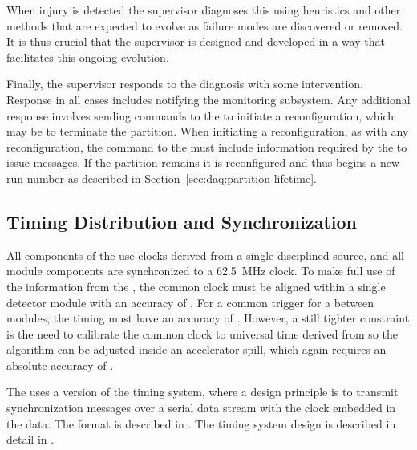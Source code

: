 When injury is detected the supervisor  diagnoses this using heuristics and other methods that are expected to evolve as failure modes are discovered or removed. 
It is thus crucial that the supervisor is designed and developed in a way that facilitates this ongoing evolution.  

Finally, the supervisor responds to the diagnosis with some intervention. 
Response  in all cases includes notifying the monitoring subsystem. 
Any additional response involves sending commands to the  to initiate a reconfiguration,  which may be to terminate the partition.
When initiating a reconfiguration, as with any reconfiguration, the command to the  must include information required by the  to issue  messages. 
If the partition remains it is reconfigured and thus begins a new run number as described in Section~\ref{sec:daq:partition-lifetime}.




\subsection{Timing Distribution and Synchronization}
\label{sec:sp-daq:design-timing}

All components of the  use clocks derived from a single  disciplined source, and all module components are synchronized to a \SI{62.5}{MHz} clock. 
To make full use of the information from the , the common clock must be aligned within a single detector %
module with an accuracy of . 
For a common trigger for a  between modules, the timing must have an accuracy of .
However, a still tighter constraint is the need to calibrate the common clock to universal time derived from  so the  algorithm can be adjusted inside an accelerator spill, which again requires an absolute accuracy of .

The   uses a version of the  timing
system, where a design principle is to transmit synchronization messages over
a serial data stream with the clock embedded in the data. The format
is described in . The timing system design is
described in detail in .

